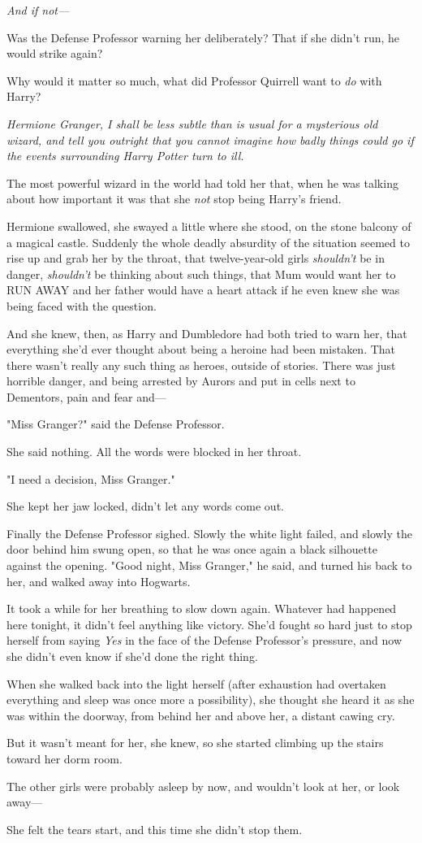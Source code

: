 \emph{And if not---}

Was the Defense Professor warning her deliberately? That if she didn't run, he
would strike again?

Why would it matter so much, what did Professor Quirrell want to \emph{do} with
Harry?

\emph{Hermione Granger, I shall be less subtle than is usual for a mysterious
old wizard, and tell you outright that you cannot imagine how badly
things could go if the events surrounding Harry Potter turn to ill.}

The most powerful wizard in the world had told her that, when he was talking
about how important it was that she \emph{not} stop being Harry's friend.

Hermione swallowed, she swayed a little where she stood, on the stone balcony
of a magical castle. Suddenly the whole deadly absurdity of the situation
seemed to rise up and grab her by the throat, that twelve-year-old girls
\emph{shouldn't} be in danger, \emph{shouldn't} be thinking about such things,
that Mum would want her to RUN AWAY and her father would have a heart attack if
he even knew she was being faced with the question.

And she knew, then, as Harry and Dumbledore had both tried to warn her, that
everything she'd ever thought about being a heroine had been mistaken. That
there wasn't really any such thing as heroes, outside of stories. There was
just horrible danger, and being arrested by Aurors and put in cells next to
Dementors, pain and fear and---

"Miss Granger?" said the Defense Professor.

She said nothing. All the words were blocked in her throat.

"I need a decision, Miss Granger."

She kept her jaw locked, didn't let any words come out.

Finally the Defense Professor sighed. Slowly the white light failed, and slowly
the door behind him swung open, so that he was once again a black silhouette
against the opening. "Good night, Miss Granger," he said, and turned his back
to her, and walked away into Hogwarts.

It took a while for her breathing to slow down again. Whatever had happened
here tonight, it didn't feel anything like victory. She'd fought so hard just
to stop herself from saying \emph{Yes} in the face of the Defense Professor's
pressure, and now she didn't even know if she'd done the right thing.

When she walked back into the light herself (after exhaustion had overtaken
everything and sleep was once more a possibility), she thought she heard it as
she was within the doorway, from behind her and above her, a distant cawing cry.

But it wasn't meant for her, she knew, so she started climbing up the stairs
toward her dorm room.

The other girls were probably asleep by now, and wouldn't look at her, or look
away---

She felt the tears start, and this time she didn't stop them.
